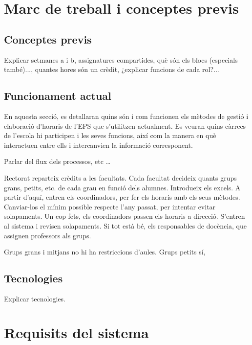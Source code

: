\documentclass[a4paper,12pt]{ThesisStyle}
\begin{document}
\chapter{Marc de treball i conceptes previs}  %
\label{cap:marcdetreball}

\section{Conceptes previs}
\label{sec:conceptes_previs}
Explicar setmanes a i b, assignatures compartides, què són els blocs (especials també)..., quantes hores
són un crèdit, ¿explicar funcions de cada rol?...

\section{Funcionament actual}
\label{sec:funcionament_actual}

En aquesta secció, es detallaran quins són i com funcionen els mètodes de gestió i elaboració d'horaris de l'EPS que s'utilitzen actualment. Es veuran quins càrrecs de l'escola hi participen i les seves funcions, així com la manera en què interactuen entre ells i intercanvien la informació corresponent.

Parlar del flux dels processos, etc \ldots

Rectorat reparteix crèdits a les facultats. Cada facultat decideix quants grups grans, petits, etc. de cada grau en funció dels alumnes. Introdueix els excels.
A partir d'aquí, entren els coordinadors, per fer els horaris amb els seus mètodes. Canviar-los el mínim possible respecte l'any passat, per intentar evitar
solapaments. Un cop fets, els coordinadors passen els horaris a direcció. S'entren al sistema i revisen solapaments. Si tot està bé, els responsables de docència,
que assignen professors als grups.

Grups grans i mitjans no hi ha restriccions d'aules. Grups petits sí,

\section{Tecnologies}
\label{sec:tecnologies}

Explicar tecnologies.

\chapter{Requisits del sistema}
\label{cap:requisits}
\end{document}
